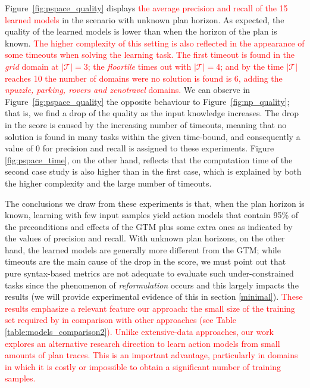 Figure~\ref{fig:pspace_quality} displays \textcolor{red}{the average precision and recall of the 15 learned models} in the scenario with unknown plan horizon. As expected, the quality of the learned models is lower than when the horizon of the plan is known. \textcolor{red}{The higher complexity of this setting is also reflected in the appearance of some timeouts when solving the learning task. The first timeout is found in the \emph{grid} domain at $|\mathcal{T}| = 3$; the \emph{floortile} times out with $|\mathcal{T}| = 4$; and by the time $|\mathcal{T}|$ reaches 10 the number of domains were no solution is found is 6, adding the \emph{npuzzle, parking, rovers and zenotravel} domains.} We can observe in Figure~\ref{fig:pspace_quality} the opposite behaviour to Figure~\ref{fig:np_quality}; that is, we find a drop of the quality as the input knowledge increases. The drop in the score is caused by the increasing number of timeouts, meaning that no solution is found in many tasks within the given time-bound, and consequently a value of $0$ for precision and recall is assigned to these experiments. Figure \ref{fig:pspace_time}, on the other hand, reflects that the computation time of the second case study is also higher than in the first case, which is explained by both the higher complexity and the large number of timeouts.


The conclusions we draw from these experiments is that, when the plan horizon is known, learning with few input samples yield action models that contain 95\% of the preconditions and effects of the GTM plus some extra ones as indicated by the values of precision and recall. With unknown plan horizons, on the other hand, the learned models are generally more different from the GTM; while timeouts are the main cause of the drop in the score, we must point out that pure syntax-based metrics are not adequate to evaluate such under-constrained tasks since the phenomenon of \emph{reformulation} occurs and this largely impacts the results (we will provide experimental evidence of this in section \ref{minimal}). \textcolor{red}{These results emphasize a relevant feature our approach: the small size of the training set required by \FAMA in comparison with other approaches (see Table \ref{table:models_comparison2}). Unlike extensive-data approaches, our work explores an alternative research direction to learn action models from small amounts of plan traces. This is an important advantage, particularly in domains in which it is costly or impossible to obtain a significant number of training samples.}


